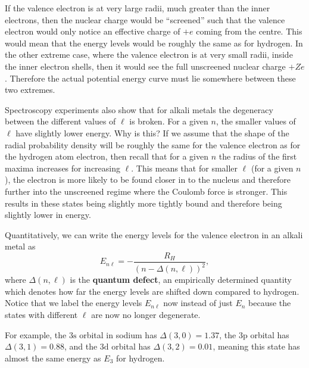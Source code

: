 \documentclass[../quantum_mechanics.tex]{subfiles}
\begin{document}
            If the valence electron is at very large radii, much greater than the inner electrons, then the nuclear charge would be ``screened'' such that the valence electron would only notice an effective charge of $+e$ coming from the centre.
            This would mean that the energy levels would be roughly the same as for hydrogen.
            In the other extreme case, where the valence electron is at very small radii, inside the inner electron shells, then it would see the full unscreened nuclear charge $+Ze$.
            Therefore the actual potential energy curve must lie somewhere between these two extremes.

            Spectroscopy experiments also show that for alkali metals the degeneracy between the different values of $\ell$ is broken.
            For a given $n$, the smaller values of $\ell$ have slightly lower energy.
            Why is this?
            If we assume that the shape of the radial probability density will be roughly the same for the valence electron as for the hydrogen atom electron, then recall that for a given $n$ the radius of the first maxima increases for increasing $\ell$.
            This means that for smaller $\ell$ (for a given $n$), the electron is more likely to be found closer in to the nucleus and therefore further into the unscreened regime where the Coulomb force is stronger.
            This results in these states being slightly more tightly bound and therefore being slightly lower in energy.

            Quantitatively, we can write the energy levels for the valence electron in an alkali metal as
            \begin{equation}
                E_{n\ell}=-\frac{R_H}{(n-\Delta(n,\ell))^2},
            \end{equation}
            where $\Delta(n,\ell)$ is the \textbf{quantum defect}, an empirically determined quantity which denotes how far the energy levels are shifted down compared to hydrogen.
            Notice that we label the energy levels $E_{n\ell}$ now instead of just $E_n$ because the states with different $\ell$ are now no longer degenerate.

            For example, the $3\text{s}$ orbital in sodium has $\Delta(3,0)=1.37$, the $3\text{p}$ orbital has $\Delta(3,1)=0.88$, and the $3\text{d}$ orbital has $\Delta(3,2)=0.01$, meaning this state has almost the same energy as $E_3$ for hydrogen.

\end{document}
